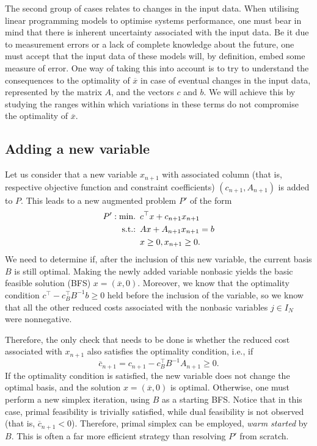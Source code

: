 The second group of cases relates to changes in the input data. When utilising linear programming models to optimise systems performance, one must bear in mind that there is inherent uncertainty associated with the input data. Be it due to measurement errors or a lack of complete knowledge about the future, one must accept that the input data of these models will, by definition, embed some measure of error. One way of taking this into account is to try to understand the consequences to the optimality of $\overline{x}$ in case of eventual changes in the input data, represented by the matrix $A$, and the vectors $c$ and $b$. We will achieve this by studying the ranges within which variations in these terms do not compromise the optimality of $\overline{x}$. 


\subsection{Adding a new variable} \label{section_611}

Let us consider that a new variable $x_{n+1}$ with associated column (that is, respective objective function and constraint coefficients) $(c_{n+1}, A_{n+1})$ is added to $P$. This leads to a new augmented problem $P'$ of the form
%
\begin{align*}
	P': \mathop{\text{min.~}} \, &c^\top x + c_{n+1}x_{n+1}\\
	\mathop{\text{s.t.:~}} \, & Ax + A_{n+1}x_{n+1}= b \\
	& x \geq 0, x_{n+1} \geq 0. 	
\end{align*}
%
We need to determine if, after the inclusion of this new variable, the current basis $B$ is still optimal. Making the newly added variable nonbasic yields the basic feasible solution (BFS) $x = (\overline{x}, 0)$. Moreover, we know that the optimality condition $c^\top - c_B^\top B^{-1}b \geq 0$ held before the inclusion of the variable, so we know that all the other reduced costs associated with the nonbasic variables $j \in I_N$ were nonnegative. 

Therefore, the only check that needs to be done is whether the reduced cost associated with $x_{n+1}$ also satisfies the optimality condition, i.e., if
%
\begin{equation*}
	\overline{c}_{n+1} = c_{n+1} - c_B^\top B^{-1}A_{n+1} \geq 0.	
\end{equation*}
%
If the optimality condition is satisfied, the new variable does not change the optimal basis, and the solution $x = (\overline{x}, 0)$ is optimal. Otherwise, one must perform a new simplex iteration, using $B$ as a starting BFS. Notice that in this case, primal feasibility is trivially satisfied, while dual feasibility is not observed (that is, $\overline{c}_{n+1} < 0$). Therefore, primal simplex can be employed, \emph{warm started} by $B$. This is often a far more efficient strategy than resolving $P'$ from scratch.


